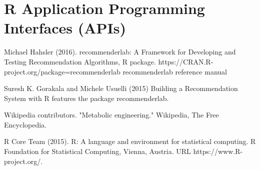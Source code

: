 \section{R Application Programming Interfaces (APIs)}





\begin{thebibliography}{00}

Michael Hahsler (2016). 
\newblock recommenderlab: A Framework for Developing and Testing Recommendation Algorithms, 
\newblock R package. https://CRAN.R-project.org/package=recommenderlab recommenderlab reference manual

Suresh K. Gorakala and Michele Usuelli (2015) 
\newblock Building a Recommendation System with R features the package recommenderlab.

Wikipedia contributors. 
\newblock "Metabolic engineering." 
\newblock Wikipedia, The Free Encyclopedia.  

R Core Team (2015). 
\newblock R: A language and environment for statistical computing. R Foundation for Statistical Computing, Vienna, Austria.
\newblock URL https://www.R-project.org/.

\end{thebibliography}

